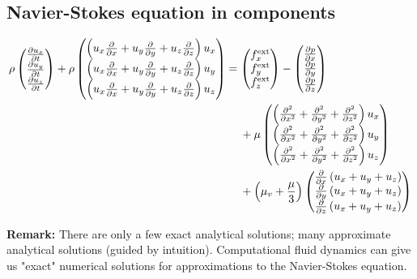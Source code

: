 \subsection{Navier-Stokes equation in components}
\begin{align}
\begin{split}\rho
\begin{pmatrix}
\frac{\partial u_x}{\partial t} \\ \frac{\partial u_y}{\partial t} \\ \frac{\partial u_z}{\partial t}
\end{pmatrix} +
\rho
\begin{pmatrix}
\left(u_x\frac{\partial }{\partial x}+u_y\frac{\partial }{\partial y}+u_z\frac{\partial }{\partial z}\right)u_x \\
\left(u_x\frac{\partial }{\partial x}+u_y\frac{\partial }{\partial y}+u_z\frac{\partial }{\partial z}\right)u_y \\
\left(u_x\frac{\partial }{\partial x}+u_y\frac{\partial }{\partial y}+u_z\frac{\partial }{\partial z}\right)u_z
\end{pmatrix} &= 
\begin{pmatrix}
f_x^\mathrm{ext} \\ f_y^\mathrm{ext} \\ f_z^\mathrm{ext}
\end{pmatrix} -
\begin{pmatrix}
\frac{\partial p}{\partial x} \\ \frac{\partial p}{\partial y} \\ \frac{\partial p}{\partial z}
\end{pmatrix} \\
&\hspace{4.5mm}+
\mu
\begin{pmatrix}
\left(\frac{\partial^2 }{\partial x^2}+\frac{\partial^2 }{\partial y^2}+\frac{\partial^2 }{\partial z^2}\right)u_x \\
\left(\frac{\partial^2 }{\partial x^2}+\frac{\partial^2 }{\partial y^2}+\frac{\partial^2 }{\partial z^2}\right)u_y \\
\left(\frac{\partial^2 }{\partial x^2}+\frac{\partial^2 }{\partial y^2}+\frac{\partial^2 }{\partial z^2}\right)u_z
\end{pmatrix} \\
&\hspace{4.5mm}+
\left(\mu_v + \frac{\mu}{3}\right)
\begin{pmatrix}
\frac{\partial }{\partial x}\left(u_x+u_y+u_z\right) \\
\frac{\partial }{\partial y}\left(u_x+u_y+u_z\right) \\
\frac{\partial }{\partial z}\left(u_x+u_y+u_z\right)
\end{pmatrix}
\end{split}
\end{align}

\begin{framed}
\textbf{Remark:} There are only a few exact analytical solutions; many approximate analytical solutions (guided by intuition). Computational fluid dynamics can give us "exact" numerical solutions for approximations to the Navier-Stokes equation.
\end{framed}

